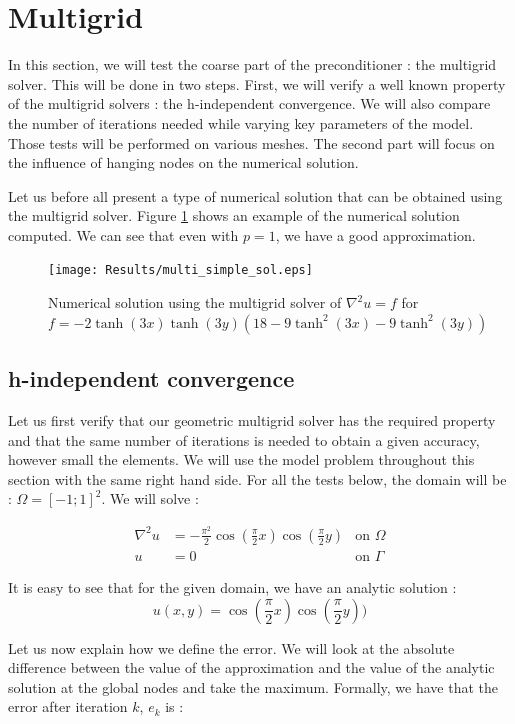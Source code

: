 \section{Multigrid}
In this section, we will test the coarse part of the preconditioner : the multigrid solver. This will be done in two steps. First, we will verify a well known property of the multigrid solvers : the h-independent convergence. We will also compare the number of iterations needed while varying key parameters of the model. Those tests will be performed on various meshes. The second part will focus on the influence of hanging nodes on the numerical solution. 

Let us before all present a type of numerical solution that can be obtained using the multigrid solver. Figure \ref{multi_simple_sol} shows an example of the numerical solution computed. We can see that even with $p=1$, we have a good approximation. 

\begin{figure}
\centering
\texttt{[image: Results/multi\_simple\_sol.eps]}
\caption{Numerical solution using the multigrid solver of $\nabla^2 u = f$ for $f = -2\tanh(3x)\tanh(3y)(18-9\tanh^2(3x)-9\tanh^2(3y))$}
\label{multi_simple_sol}
\end{figure}

\subsection{h-independent convergence}
Let us first verify that our geometric multigrid solver has the required property and that the same number of iterations is needed to obtain a given accuracy, however small the elements. We will use the model problem throughout this section with the same right hand side. For all the tests below, the domain  will be : $\Omega = [-1;1]^2$. We will solve : 

\begin{align}
\nabla^2 u &= -\frac{\pi^2}{2}\cos(\frac{\pi}{2}x)\cos(\frac{\pi}{2}y) &\text{on $\Omega$} \label{eq:prob1} \\
u &= 0  &\text{on $\Gamma$}
\end{align}

It is easy to see that for the given domain, we have an analytic solution : 
$$u(x,y) = \cos(\frac{\pi}{2}x)\cos(\frac{\pi}{2}y))$$ 


Let us now explain how we define the error. We will look at the absolute difference between the value of the approximation and the value of the analytic solution at the global nodes and take the maximum. Formally, we have that the error after iteration $k$, $e_k$ is :


